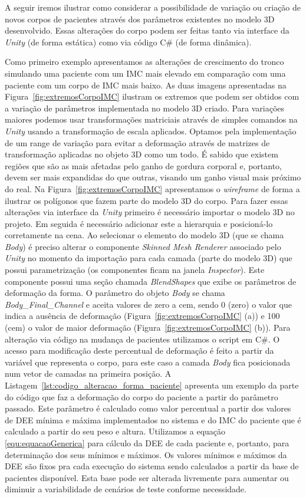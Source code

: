 A seguir iremos ilustrar como considerar a possibilidade de variação ou criação de novos corpos de pacientes através dos parâmetros existentes no modelo 3D desenvolvido. Essas alterações do corpo podem ser feitas tanto via interface da \textit{Unity} (de forma estática) como via código C\# (de forma dinâmica). 

Como primeiro exemplo apresentamos as alterações de crescimento do tronco simulando uma paciente com um \acrshort{IMC} mais elevado em comparação com uma paciente com um corpo de \acrshort{IMC} mais baixo. As duas imagens apresentadas na Figura~\ref{fig:extremosCorpoIMC} ilustram os extremos que podem ser obtidos com a variação de parâmetros implementada no modelo 3D criado. Para variações maiores podemos usar transformações matriciais através de simples comandos na \textit{Unity} usando a transformação de escala aplicados. Optamos pela implementação de um range de variação para evitar a deformação através de matrizes de transformação aplicadas no objeto 3D como um todo. É sabido que existem regiões que são as mais afetadas pelo ganho de gordura corporal e, portanto, devem ser mais expandidas do que outras, visando um ganho visual mais próximo do real. Na Figura~\ref{fig:extremosCorpoIMC} apresentamos o \textit{wireframe} de forma a ilustrar os polígonos que fazem parte do modelo 3D do corpo. Para fazer essas alterações via interface da \textit{Unity} primeiro é necessário importar o modelo 3D no projeto. Em seguida é necessário adicionar este a hierarquia e posicioná-lo corretamente na cena. Ao selecionar o elemento do modelo 3D (que se chama \textit{Body}) é preciso alterar o componente \textit{Skinned Mesh Renderer} associado pelo \textit{Unity} no momento da importação para cada camada (parte do modelo 3D) que possui parametrização (os componentes ficam na janela \textit{Inspector}). Este componente possui uma seção chamada \textit{BlendShapes} que exibe os parâmetros de deformação da forma. O parâmetro do objeto \textit{Body} se chama \textit{Body\_Final\_Channel} e aceita valores de zero a cem, sendo 0 (zero) o valor que indica a ausência de deformação (Figura~\ref{fig:extremosCorpoIMC} (a)) e 100 (cem) o valor de maior deformação (Figura~\ref{fig:extremosCorpoIMC} (b)). Para alteração via código na mudança de pacientes utilizamos o script em C\#. O acesso para modificação deste percentual de deformação é feito a partir da variável que representa o corpo, para este caso a camada \textit{Body} fica posicionada num vetor de camadas na primeira posição. A Listagem~\ref{lst:codigo_alteracao_forma_paciente} apresenta um exemplo da parte do código que faz a deformação do corpo do paciente a partir do parâmetro passado. Este parâmetro é calculado como valor percentual a partir dos valores de \acrshort{DEE} mínima e máxima implementados no sistema e do \acrshort{IMC} do paciente que é calculado a partir do seu peso e altura. Utilizamos a equação \ref{equ:equacaoGenerica} para cálculo da \acrshort{DEE} de cada paciente e, portanto, para determinação dos seus mínimos e máximos. Os valores mínimos e máximos da \acrshort{DEE} são fixos pra cada execução do sistema sendo calculados a partir da base de pacientes disponível. Esta base pode ser alterada livremente para aumentar ou diminuir a variabilidade de cenários de teste conforme necessidade.

